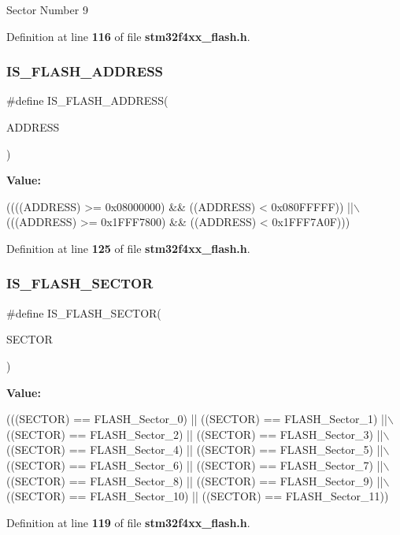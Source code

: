 Sector Number 9 

Definition at line \textbf{ 116} of file \textbf{ stm32f4xx\+\_\+flash.\+h}.

\mbox{\label{group__FLASH__Sectors_gad0c8166ba15a0b8d458412a8bb74e2f0}} 
\subsubsection{I\+S\+\_\+\+F\+L\+A\+S\+H\+\_\+\+A\+D\+D\+R\+E\+SS}
{\footnotesize\ttfamily \#define I\+S\+\_\+\+F\+L\+A\+S\+H\+\_\+\+A\+D\+D\+R\+E\+SS(\begin{DoxyParamCaption}\item[{}]{A\+D\+D\+R\+E\+SS }\end{DoxyParamCaption})}

{\bfseries Value\+:}
\begin{DoxyCode}
((((ADDRESS) >= 0x08000000) && ((ADDRESS) < 0x080FFFFF)) ||\(\backslash\)
                                   (((ADDRESS) >= 0x1FFF7800) && ((ADDRESS) < 0x1FFF7A0F)))
\end{DoxyCode}


Definition at line \textbf{ 125} of file \textbf{ stm32f4xx\+\_\+flash.\+h}.

\mbox{\label{group__FLASH__Sectors_ga9e7722ee983a9411f59c0fdb81bc0e08}} 
\subsubsection{I\+S\+\_\+\+F\+L\+A\+S\+H\+\_\+\+S\+E\+C\+T\+OR}
{\footnotesize\ttfamily \#define I\+S\+\_\+\+F\+L\+A\+S\+H\+\_\+\+S\+E\+C\+T\+OR(\begin{DoxyParamCaption}\item[{}]{S\+E\+C\+T\+OR }\end{DoxyParamCaption})}

{\bfseries Value\+:}
\begin{DoxyCode}
(((SECTOR) == FLASH_Sector_0) || ((SECTOR) == FLASH_Sector_1) ||\(\backslash\)
                                 ((SECTOR) == FLASH_Sector_2) || ((SECTOR) == 
      FLASH_Sector_3) ||\(\backslash\)
                                 ((SECTOR) == FLASH_Sector_4) || ((SECTOR) == 
      FLASH_Sector_5) ||\(\backslash\)
                                 ((SECTOR) == FLASH_Sector_6) || ((SECTOR) == 
      FLASH_Sector_7) ||\(\backslash\)
                                 ((SECTOR) == FLASH_Sector_8) || ((SECTOR) == 
      FLASH_Sector_9) ||\(\backslash\)
                                 ((SECTOR) == FLASH_Sector_10) || ((SECTOR) == 
      FLASH_Sector_11))
\end{DoxyCode}


Definition at line \textbf{ 119} of file \textbf{ stm32f4xx\+\_\+flash.\+h}.


